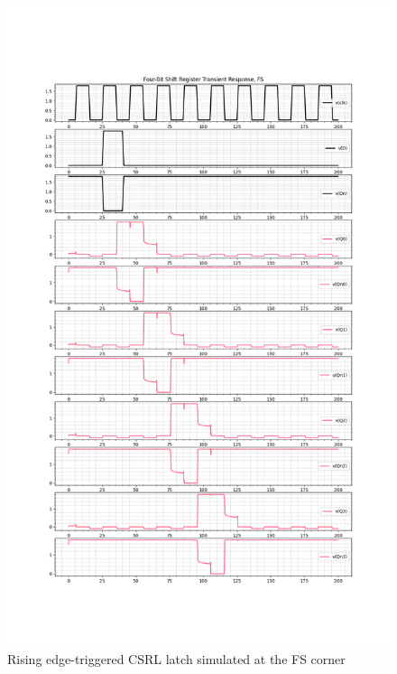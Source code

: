 \documentclass[11pt]{article}
\begin{document}
\begin{figure}[H]
  \centering
  \includegraphics[width=13cm]{media/csrl_rising_edge_x4_fs.png}
  \caption{Rising edge-triggered CSRL latch simulated at the FS corner}
\end{figure}
\end{document}
